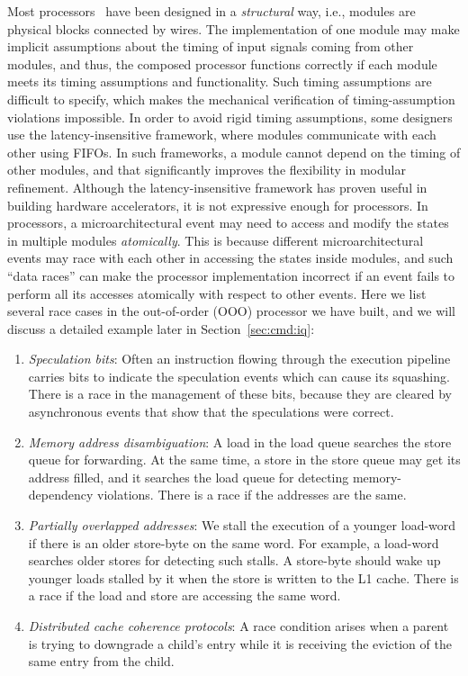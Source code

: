 \documentclass[conference]{IEEEtran}
\begin{document}
Most processors~\cite{rocketchip,boom,fabscalar,pulp} have been designed in a \emph{structural} way, i.e., modules are physical blocks connected by wires.
The implementation of one module may make implicit assumptions about the timing of input signals coming from other modules, and thus, the composed processor functions correctly if each module meets its timing assumptions and functionality.
Such timing assumptions are difficult to specify, which makes the mechanical verification of timing-assumption violations impossible.
In order to avoid rigid timing assumptions, some designers use the latency-insensitive framework, where modules communicate with each other using FIFOs.
In such frameworks, a module cannot depend on the timing of other modules, and that significantly improves the flexibility in modular refinement.
Although the latency-insensitive framework has proven useful in building hardware accelerators, it is not expressive enough for processors. 
In processors, a microarchitectural event may need to access and modify the states in multiple modules \emph{atomically}. 
This is because different microarchitectural events may race with each other in accessing the states inside modules, and such ``data races'' can make the processor implementation incorrect if an event fails to perform all its accesses atomically with respect to other events.
Here we list several race cases in the out-of-order (OOO) processor we have built, and we will discuss a detailed example later in Section~\ref{sec:cmd:iq}:
\begin{enumerate}
    \item \emph{Speculation bits}:
    Often an instruction flowing through the execution pipeline carries bits to indicate the speculation events which can cause its squashing.
    There is a race in the management of these bits, because they are cleared by asynchronous events that show that the speculations were correct.
    
    \item \emph{Memory address disambiguation}:
    A load in the load queue searches the store queue for forwarding.
    At the same time, a store in the store queue may get its address filled, and it searches the load queue for detecting memory-dependency violations. 
    There is a race if the addresses are the same.
    
    \item \emph{Partially overlapped addresses}:
    We stall the execution of a younger load-word if there is an older store-byte on the same word.
    For example, a load-word searches older stores for detecting such stalls. %
    A store-byte should wake up younger loads stalled by it when the store is written to the L1 cache.
    There is a race if the load and store are accessing the same word.
    
    \item \emph{Distributed cache coherence protocols}:
    A race condition arises when a parent is trying to downgrade a child's entry while it is receiving the eviction of the same entry from the child.
\end{enumerate}
\end{document}
